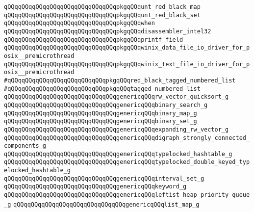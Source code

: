 \verb|qQQqqQQqqQQqqQQqqQQqqQQqqQQqqQQqpkgqQQqunt_red_black_map|\newline
\verb|qQQqqQQqqQQqqQQqqQQqqQQqqQQqqQQqpkgqQQqunt_red_black_set|\newline
\verb|qQQqqQQqqQQqqQQqqQQqqQQqqQQqqQQqpkgqQQqwhen|\newline
\verb|qQQqqQQqqQQqqQQqqQQqqQQqqQQqqQQqpkgqQQqdisassembler_intel32|\newline
\verb|qQQqqQQqqQQqqQQqqQQqqQQqqQQqqQQqpkgqQQqprintf_field|\newline
\verb|qQQqqQQqqQQqqQQqqQQqqQQqqQQqqQQqpkgqQQqwinix_data_file_io_driver_for_posix__premicrothread|\newline
\verb|qQQqqQQqqQQqqQQqqQQqqQQqqQQqqQQqpkgqQQqwinix_text_file_io_driver_for_posix__premicrothread|\newline
\newline
\verb|#qQQqqQQqqQQqqQQqqQQqqQQqqQQqpkgqQQqred_black_tagged_numbered_list|\newline
\verb|#qQQqqQQqqQQqqQQqqQQqqQQqqQQqpkgqQQqtagged_numbered_list|\newline
\newline
\verb|qQQqqQQqqQQqqQQqqQQqqQQqqQQqqQQqgenericqQQqrw_vector_quicksort_g|\newline
\verb|qQQqqQQqqQQqqQQqqQQqqQQqqQQqqQQqgenericqQQqbinary_search_g|\newline
\verb|qQQqqQQqqQQqqQQqqQQqqQQqqQQqqQQqgenericqQQqbinary_map_g|\newline
\verb|qQQqqQQqqQQqqQQqqQQqqQQqqQQqqQQqgenericqQQqbinary_set_g|\newline
\verb|qQQqqQQqqQQqqQQqqQQqqQQqqQQqqQQqgenericqQQqexpanding_rw_vector_g|\newline
\verb|qQQqqQQqqQQqqQQqqQQqqQQqqQQqqQQqgenericqQQqdigraph_strongly_connected_components_g|\newline
\verb|qQQqqQQqqQQqqQQqqQQqqQQqqQQqqQQqgenericqQQqtypelocked_hashtable_g|\newline
\verb|qQQqqQQqqQQqqQQqqQQqqQQqqQQqqQQqgenericqQQqtypelocked_double_keyed_typelocked_hashtable_g|\newline
\verb|qQQqqQQqqQQqqQQqqQQqqQQqqQQqqQQqgenericqQQqinterval_set_g|\newline
\verb|qQQqqQQqqQQqqQQqqQQqqQQqqQQqqQQqgenericqQQqkeyword_g|\newline
\verb|qQQqqQQqqQQqqQQqqQQqqQQqqQQqqQQqgenericqQQqleftist_heap_priority_queue_g|\newline
\verb|qQQqqQQqqQQqqQQqqQQqqQQqqQQqqQQqgenericqQQqlist_map_g|\newline
